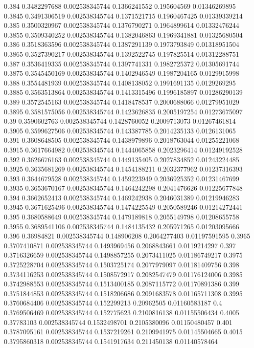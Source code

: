 {0.384 0.3482297688 0.002538345744 0.1366241552 0.195604569 0.01346269895
0.3845 0.3491306519 0.002538345744 0.1371521715 0.1960467425 0.01339339214
0.385 0.3500320967 0.002538345744 0.1376790271 0.1964899614 0.01332476244
0.3855 0.3509340252 0.002538345744 0.1382046863 0.1969341881 0.01325680504
0.386 0.3518363596 0.002538345744 0.1387291139 0.1973793849 0.01318951504
0.3865 0.3527390217 0.002538345744 0.1392522745 0.197825514 0.01312288751
0.387 0.3536419335 0.002538345744 0.1397741331 0.1982725372 0.01305691744
0.3875 0.3545450169 0.002538345744 0.1402946549 0.1987204165 0.0129915998
0.388 0.3554481939 0.002538345744 0.1408138052 0.1991691135 0.0129269295
0.3885 0.3563513864 0.002538345744 0.1413315496 0.1996185897 0.01286290139
0.389 0.3572545163 0.002538345744 0.1418478537 0.2000688066 0.01279951029
0.3895 0.3581575056 0.002538345744 0.1423626835 0.2005197254 0.01273675097
0.39 0.3590602763 0.002538345744 0.1428760052 0.2009713073 0.01267461814
0.3905 0.3599627506 0.002538345744 0.143387785 0.2014235133 0.0126131065
0.391 0.3608648505 0.002538345744 0.1438979896 0.2018763044 0.01255221068
0.3915 0.3617664982 0.002538345744 0.1444065858 0.2023296414 0.01249192528
0.392 0.3626676163 0.002538345744 0.1449135405 0.2027834852 0.01243224485
0.3925 0.3635681269 0.002538345744 0.1454188211 0.2032377962 0.01237316393
0.393 0.3644679528 0.002538345744 0.1459223949 0.2036925352 0.01231467699
0.3935 0.3653670167 0.002538345744 0.1464242298 0.2041476626 0.01225677848
0.394 0.3662652413 0.002538345744 0.1469242938 0.2046031389 0.01219946283
0.3945 0.3671625496 0.002538345744 0.1474225549 0.2050589246 0.01214272441
0.395 0.3680588649 0.002538345744 0.1479189818 0.2055149798 0.01208655758
0.3955 0.3689541106 0.002538345744 0.1484135432 0.205971265 0.01203095666
0.396 0.36984821 0.002538345744 0.148906208 0.2064277403 0.01197591595
0.3965 0.3707410871 0.002538345744 0.1493969456 0.2068843661 0.0119214297
0.397 0.3716326659 0.002538345744 0.1498857255 0.2073411025 0.01186749217
0.3975 0.3725228704 0.002538345744 0.1503725174 0.2077979097 0.01181409756
0.398 0.3734116253 0.002538345744 0.1508572917 0.2082547479 0.01176124006
0.3985 0.3742988553 0.002538345744 0.1513400185 0.2087115772 0.01170891386
0.399 0.3751844853 0.002538345744 0.1518206686 0.2091683578 0.01165711308
0.3995 0.3760684406 0.002538345744 0.152299213 0.20962505 0.01160583187
0.4 0.3769506469 0.002538345744 0.152775623 0.2100816138 0.01155506434
0.4005 0.37783103 0.002538345744 0.1532498701 0.2105380096 0.01150480457
0.401 0.3787095161 0.002538345744 0.1537219261 0.2109941975 0.01145504665
0.4015 0.3795860318 0.002538345744 0.1541917634 0.211450138 0.01140578464
}
